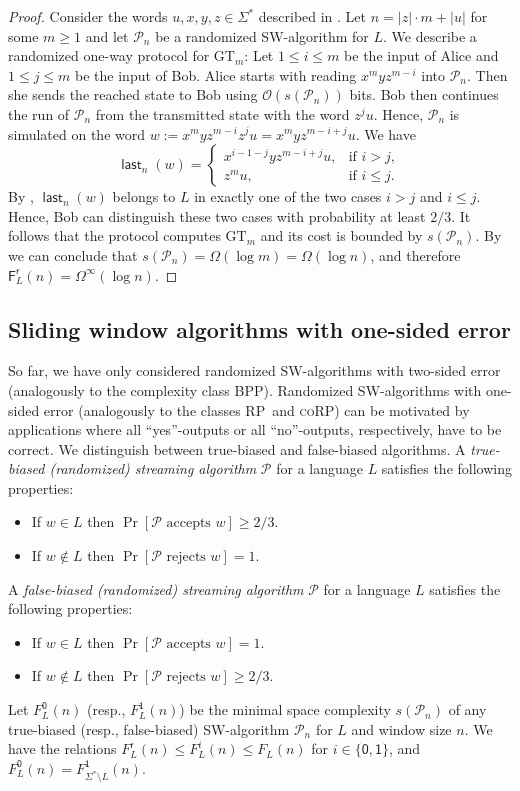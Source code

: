 \documentclass{article}\usepackage[a4paper,margin=20mm]{geometry}
\renewcommand{\O}{\mathcal{O}}
\renewcommand{\P}{\mathcal{P}}
\newcommand{\F}{\mathsf{F}}
\renewcommand{\r}{\mathsf{r}}
\DeclareMathOperator{\last}{\mathsf{last}}
\newcommand{\BPP}{\textsc{BPP}}
\newcommand{\RP}{\textsc{RP}}
\newcommand{\coRP}{\textsc{coRP}}
\renewcommand{\geq}{\geqslant}
\renewcommand{\leq}{\leqslant}
\renewcommand{\ge}{\geq}
\renewcommand{\le}{\leq}
\newcommand{\Omegainf}{\Omega^{\scriptscriptstyle{\infty}}}
\begin{document}
\begin{proof}
Consider the words $u,x,y,z\in\Sigma^*$ described in .
Let $n= |z| \cdot m+|u|$ for some $m \ge 1$
and let $\P_n$ be a randomized SW-algorithm for $L$.
We describe a randomized one-way protocol for $\mathrm{GT}_m$:
Let $1 \le i \le m$ be the input of Alice and $1 \le j \le m$ be the input of Bob.
Alice starts with reading $x^m y z^{m-i}$ into $\P_n$. Then she sends the reached state to Bob using $\O(s(\P_n))$ bits.
Bob then continues the run of $\P_n$ from the transmitted state with the word $z^j u$.
Hence, $\P_n$ is simulated on the word $w := x^m y z^{m-i} z^j u = x^m y z^{m-i+j} u$.
We have
\[
	\last_n(w) = \begin{cases}
	x^{i-1-j} y z^{m-i+j} u, & \text{if } i > j, \\
	z^m u, & \text{if } i \le j.
	\end{cases}
\]
By , $\last_n(w)$ belongs to $L$ in exactly one of the two cases
$i>j$ and $i \leq j$. Hence, Bob can distinguish these two cases with probability at least $2/3$.
It follows that the protocol computes $\mathrm{GT}_m$ and its cost is bounded by $s(\P_n)$.
By  we can conclude that $s(\P_n) = \Omega(\log m) = \Omega(\log n)$,
and therefore $\F^\r_L(n) = \Omegainf(\log n)$.
\end{proof}

\subsection{Sliding window algorithms with one-sided error} \label{sec-one-sided}

So far, we have only considered randomized SW-algorithms with two-sided error (analogously to the 
complexity class \BPP).
Randomized SW-algorithms with one-sided error (analogously to the 
classes \RP~and \coRP) can be motivated by applications where all ``yes''-outputs or
all ``no''-outputs, respectively, have to be correct. 
We distinguish between true-biased and false-biased algorithms.
A {\em true-biased (randomized) streaming algorithm} $\P$ for a language $L$ 
satisfies the following properties:
\begin{itemize}
	\item If $w \in L$ then $\Pr[\P \text{ accepts } w] \ge 2/3$.
	\item If $w \notin L$ then $\Pr[\P \text{ rejects } w] = 1$.
\end{itemize}
A {\em false-biased (randomized) streaming algorithm} $\P$ for a language $L$ satisfies the following properties:
\begin{itemize}
	\item If $w \in L$ then $\Pr[\P \text{ accepts } w]  = 1$.
	\item If $w \notin L$ then $\Pr[\P \text{ rejects } w] \ge 2/3$.
\end{itemize}
Let $F^\mathsf{0}_L(n)$ (resp., $F^\mathsf{1}_L(n)$) be the minimal space complexity $s(\P_n)$
of any true-biased (resp., false-biased) SW-algorithm $\P_n$ for $L$ and window size $n$.
We have the relations $F^\r_L(n) \le F^i_L(n) \le F_L(n)$ for $i \in \{ \mathsf{0}, \mathsf{1} \}$,
and $F^\mathsf{0}_L(n) = F^\mathsf{1}_{\Sigma^* \setminus L}(n)$.
\end{document}
